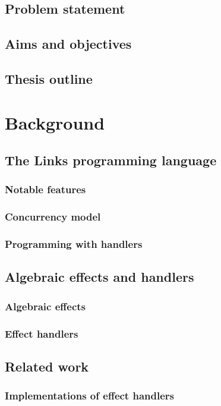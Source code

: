 \documentclass[mscres,icsa,lfcs,twoside,openright,logo,rightchapter,normalheadings]{infthesis}
\theoremstyle{definition}
\begin{document}
\section{Problem statement}
\section{Aims and objectives}
\section{Thesis outline}

\chapter{Background}
\section{The Links programming language}
\subsection{Notable features}
\subsection{Concurrency model}
\subsection{Programming with handlers}

\section{Algebraic effects and handlers}
\subsection{Algebraic effects}
\subsection{Effect handlers}

\section{Related work}
\subsection{Implementations of effect handlers}
\end{document}
